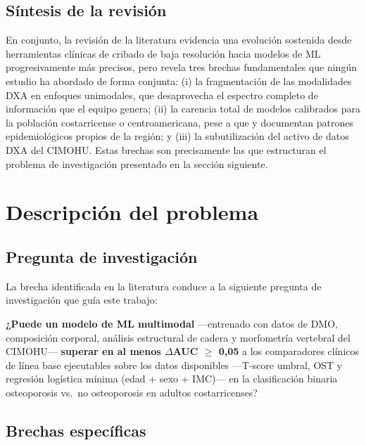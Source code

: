 \documentclass[../tesis.tex]{subfiles}
\begin{document}
\subsection*{Síntesis de la revisión}

En conjunto, la revisión de la literatura evidencia una evolución sostenida desde herramientas clínicas de cribado de baja resolución hacia modelos de ML progresivamente más precisos, pero revela tres brechas fundamentales que ningún estudio ha abordado de forma conjunta: (i) la fragmentación de las modalidades DXA en enfoques unimodales, que desaprovecha el espectro completo de información que el equipo genera; (ii) la carencia total de modelos calibrados para la población costarricense o centroamericana, pese a que \textcite{Medina2025} y \textcite{CerdasPerez2026} documentan patrones epidemiológicos propios de la región; y (iii) la subutilización del activo de datos DXA del CIMOHU. Estas brechas son precisamente las que estructuran el problema de investigación presentado en la sección siguiente.

\section{Descripción del problema}
\label{problema}

\subsection{Pregunta de investigación}

La brecha identificada en la literatura conduce a la siguiente pregunta de investigación que guía este trabajo:

\begin{displayquote}
\textbf{¿Puede un modelo de ML multimodal} ---entrenado con datos de DMO, composición corporal, análisis estructural de cadera y morfometría vertebral del CIMOHU--- \textbf{superar en al menos $\Delta$AUC $\geq$ 0{,}05} a los comparadores clínicos de línea base ejecutables sobre los datos disponibles ---T-score umbral, OST y regresión logística mínima (edad + sexo + IMC)--- en la clasificación binaria osteoporosis vs.\ no osteoporosis en adultos costarricenses?
\end{displayquote}

\subsection{Brechas específicas}
\end{document}
